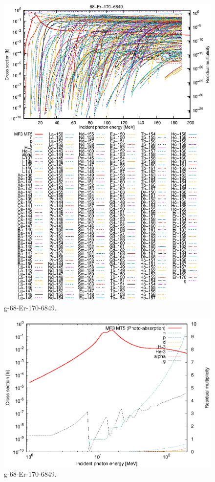 \begin{figure}
 \includegraphics[width=\linewidth]{eps/g_68-Er-170_6849.eps}
  \caption{g-68-Er-170-6849.}
\end{figure}
\newpage \clearpage

\begin{figure}
 \includegraphics[width=\linewidth]{eps-log/g_68-Er-170_6849.eps}
 \caption{g-68-Er-170-6849.}
\end{figure}
\newpage \clearpage

